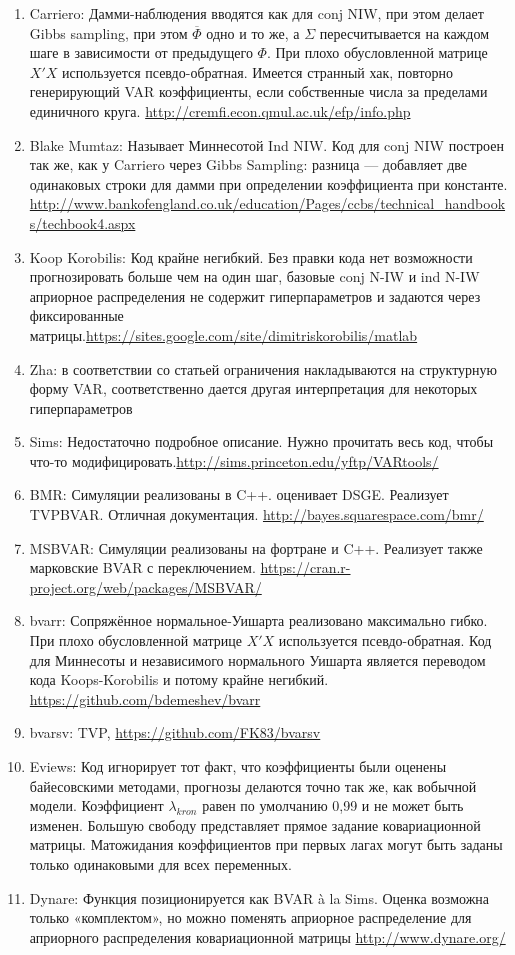 \documentclass[11pt]{article} %
\newcommand{\post}{\overline}
\begin{document}
\begin{enumerate}
\item Carriero: Дамми-наблюдения вводятся как для conj NIW, при этом делает Gibbs sampling, при этом $\post\Phi$ одно и то же, а $\Sigma$ пересчитывается на каждом шаге в зависимости от предыдущего $\Phi$. При плохо обусловленной матрице $X'X$ используется псевдо-обратная. Имеется странный хак, повторно генерирующий VAR коэффициенты, если собственные числа за пределами единичного круга. \url{http://cremfi.econ.qmul.ac.uk/efp/info.php}
\item Blake Mumtaz: Называет Миннесотой Ind NIW.  Код для conj NIW построен так же, как у Carriero через Gibbs Sampling: разница --- добавляет две одинаковых строки для дамми при определении коэффициента при константе. \url{http://www.bankofengland.co.uk/education/Pages/ccbs/technical_handbooks/techbook4.aspx}
\item Koop Korobilis: Код крайне негибкий. Без правки кода нет возможности прогнозировать больше чем на один шаг, базовые conj N-IW и ind N-IW априорное распределения не содержит  гиперпараметров и задаются через фиксированные матрицы.\url{https://sites.google.com/site/dimitriskorobilis/matlab}\\
\item Zha: в соответствии со статьей ограничения накладываются на структурную форму VAR, соответственно дается другая интерпретация для некоторых гиперпараметров
\item Sims: Недостаточно подробное описание. Нужно прочитать весь код, чтобы что-то модифицировать.\url{http://sims.princeton.edu/yftp/VARtools/}
\item BMR: Симуляции реализованы в C++.  оценивает DSGE.  Реализует TVPBVAR. Отличная документация. \url{ http://bayes.squarespace.com/bmr/}
\item MSBVAR: Симуляции реализованы на фортране и C++. Реализует также марковские BVAR с переключением.  \url{https://cran.r-project.org/web/packages/MSBVAR/ }
\item bvarr: Сопряжённое нормальное-Уишарта реализовано максимально гибко.  При плохо обусловленной матрице $X'X$ используется псевдо-обратная. Код для Миннесоты и независимого нормального Уишарта является переводом кода Koops-Korobilis и потому крайне негибкий. \url{https://github.com/bdemeshev/bvarr }
\item bvarsv: TVP, \url{https://github.com/FK83/bvarsv}
\item Eviews: Код игнорирует тот факт, что коэффициенты были оценены байесовскими методами, прогнозы делаются точно так же, как вобычной модели. Коэффициент $\lambda_{kron}$ равен по умолчанию 0,99 и не может быть изменен. Большую свободу представляет прямое задание ковариационной матрицы. Матожидания коэффициентов при первых лагах могут быть заданы только одинаковыми для всех переменных.
\item Dynare: Функция позиционируется как BVAR \`a la Sims. Оценка возможна только «комплектом», но можно поменять априорное распределение для априорного распределения ковариационной матрицы  \url{http://www.dynare.org/}
\end{enumerate}
\newpage
\end{document}
